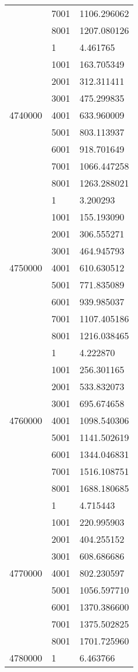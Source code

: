 \begin{table}[htb!]
\begin{tabular}{lll}
 & 7001 & 1106.296062 \\
 & 8001 & 1207.080126 \\
\multirow[c]{9}{*}{4740000} & 1 & 4.461765 \\
 & 1001 & 163.705349 \\
 & 2001 & 312.311411 \\
 & 3001 & 475.299835 \\
 & 4001 & 633.960009 \\
 & 5001 & 803.113937 \\
 & 6001 & 918.701649 \\
 & 7001 & 1066.447258 \\
 & 8001 & 1263.288021 \\
\multirow[c]{9}{*}{4750000} & 1 & 3.200293 \\
 & 1001 & 155.193090 \\
 & 2001 & 306.555271 \\
 & 3001 & 464.945793 \\
 & 4001 & 610.630512 \\
 & 5001 & 771.835089 \\
 & 6001 & 939.985037 \\
 & 7001 & 1107.405186 \\
 & 8001 & 1216.038465 \\
\multirow[c]{9}{*}{4760000} & 1 & 4.222870 \\
 & 1001 & 256.301165 \\
 & 2001 & 533.832073 \\
 & 3001 & 695.674658 \\
 & 4001 & 1098.540306 \\
 & 5001 & 1141.502619 \\
 & 6001 & 1344.046831 \\
 & 7001 & 1516.108751 \\
 & 8001 & 1688.180685 \\
\multirow[c]{9}{*}{4770000} & 1 & 4.715443 \\
 & 1001 & 220.995903 \\
 & 2001 & 404.255152 \\
 & 3001 & 608.686686 \\
 & 4001 & 802.230597 \\
 & 5001 & 1056.597710 \\
 & 6001 & 1370.386600 \\
 & 7001 & 1375.502825 \\
 & 8001 & 1701.725960 \\
\multirow[c]{9}{*}{4780000} & 1 & 6.463766 \\

\end{tabular}
\end{table}
